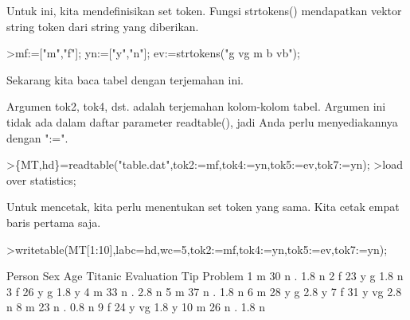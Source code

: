 \documentclass[a4paper,10pt]{article}
\begin{document}
\begin{eulernotebook}
\begin{eulercomment}
\begin{eulercomment}
\begin{eulercomment}
\begin{eulercomment}
\begin{eulercomment}
\begin{eulercomment}
\begin{eulercomment}
\begin{eulercomment}
\begin{eulercomment}
\begin{eulercomment}
\begin{eulercomment}
\begin{eulercomment}
\begin{eulercomment}
\begin{eulercomment}
\begin{eulercomment}
\begin{eulercomment}
\begin{eulercomment}
\begin{eulercomment}
\begin{eulercomment}
\begin{eulercomment}
\begin{eulercomment}
\begin{eulercomment}
\begin{eulercomment}
\begin{eulercomment}
\begin{eulercomment}
\begin{eulercomment}
\begin{eulercomment}
\begin{eulercomment}
\begin{eulercomment}
\begin{eulercomment}
\begin{eulercomment}
\begin{eulercomment}
\begin{eulercomment}
Untuk ini, kita mendefinisikan set token. Fungsi strtokens()
mendapatkan vektor string token dari string yang diberikan.
\end{eulercomment}
\begin{eulerprompt}
>mf:=["m","f"]; yn:=["y","n"]; ev:=strtokens("g vg m b vb");
\end{eulerprompt}
\begin{eulercomment}
Sekarang kita baca tabel dengan terjemahan ini.

Argumen tok2, tok4, dst. adalah terjemahan kolom-kolom tabel. Argumen
ini tidak ada dalam daftar parameter readtable(), jadi Anda perlu
menyediakannya dengan ":=".
\end{eulercomment}
\begin{eulerprompt}
>\{MT,hd\}=readtable("table.dat",tok2:=mf,tok4:=yn,tok5:=ev,tok7:=yn);
>load over statistics;
\end{eulerprompt}
\begin{eulercomment}
Untuk mencetak, kita perlu menentukan set token yang sama. Kita cetak
empat baris pertama saja.
\end{eulercomment}
\begin{eulerprompt}
>writetable(MT[1:10],labc=hd,wc=5,tok2:=mf,tok4:=yn,tok5:=ev,tok7:=yn);
\end{eulerprompt}
\begin{euleroutput}
   Person  Sex  Age Titanic Evaluation  Tip Problem
        1    m   30       n          .  1.8       n
        2    f   23       y          g  1.8       n
        3    f   26       y          g  1.8       y
        4    m   33       n          .  2.8       n
        5    m   37       n          .  1.8       n
        6    m   28       y          g  2.8       y
        7    f   31       y         vg  2.8       n
        8    m   23       n          .  0.8       n
        9    f   24       y         vg  1.8       y
       10    m   26       n          .  1.8       n
\end{euleroutput}

\end{eulercomment}
\end{eulercomment}
\end{eulercomment}
\end{eulercomment}
\end{eulercomment}
\end{eulercomment}
\end{eulercomment}
\end{eulercomment}
\end{eulercomment}
\end{eulercomment}
\end{eulercomment}
\end{eulercomment}
\end{eulercomment}
\end{eulercomment}
\end{eulercomment}
\end{eulercomment}
\end{eulercomment}
\end{eulercomment}
\end{eulercomment}
\end{eulercomment}
\end{eulercomment}
\end{eulercomment}
\end{eulercomment}
\end{eulercomment}
\end{eulercomment}
\end{eulercomment}
\end{eulercomment}
\end{eulercomment}
\end{eulercomment}
\end{eulercomment}
\end{eulercomment}
\end{eulercomment}
\end{eulernotebook}
\end{document}
